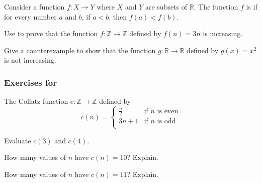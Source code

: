 \begin{exer} [\exerE]%
\label{exer_defn_increasing}
    Consider a function $f: X \to Y$ where $X$ and $Y$ are subsets of $\mathbb{R}$.  The function $f$ is  if for every number $a$ and $b$, if $a < b$, then $f(a) < f(b)$.
        \begin{exerpart}
            \item Use  to prove that the function $f: \mathbb{Z} \to \mathbb{Z}$ defined by $f(n) = 3n$ is increasing.
            \item Give a counterexample to show that the function $g: \mathbb{R} \to \mathbb{R}$ defined by $g(x) = x^2$ is not increasing.
        \end{exerpart}
\end{exer}


\subsubsection*{Exercises for  \subpiecewise}

\begin{exer}[\exerP] %
\label{exer_evaluate_collatz}  
    The Collatz function $c: \mathbb{Z} \to \mathbb{Z}$ defined by 
    $$c(n) =  \left\{ 
    \begin{array} {cl} 
    \frac{n}{2} & \text{if } n \text{ is even} \\ 
    3n+1 & \text{if } n \text{ is odd} \\  
    \end{array} 
    \right.$$
        \begin{exerpart}
            \item Evaluate $c(3)$ and $c(4)$.          
            \item How many values of $n$ have $c(n) = 10$?  Explain.
            \item How many values of $n$ have $c(n) = 11$? Explain.    
        \end{exerpart}
\end{exer}

